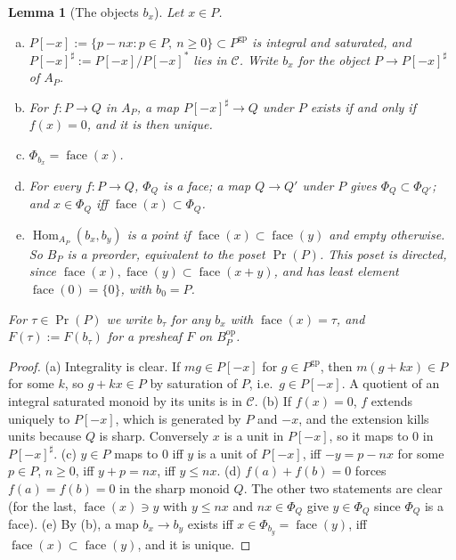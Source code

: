 \documentclass[11pt]{article}
\newtheorem{lemma}[theorem]{Lemma}
\theoremstyle{definition}
\theoremstyle{remark}
\newcommand{\cC}{\mathcal{C}}
\newcommand{\gp}{\mathrm{gp}}
\newcommand{\face}{\operatorname{face}}
\newcommand{\Prin}{\operatorname{Pr}}
\newcommand{\Hom}{\operatorname{Hom}}
\begin{document}
\begin{lemma}[The objects $b_x$]\label{lem:bx}
Let $x\in P$.
\begin{enumerate}[(a)]
\item $P[-x]:=\{p-nx: p\in P,\ n\ge0\}\subset P^{\gp}$ is integral and saturated, and $P[-x]^\sharp:=P[-x]/P[-x]^*$ lies in $\cC$. Write $b_x$ for the object $P\to P[-x]^\sharp$ of $A_P$.
\item For $f\colon P\to Q$ in $A_P$, a map $P[-x]^\sharp\to Q$ under $P$ exists if and only if $f(x)=0$, and it is then unique.
\item $\Phi_{b_x}=\face(x)$.
\item For every $f\colon P\to Q$, $\Phi_Q$ is a face; a map $Q\to Q'$ under $P$ gives $\Phi_Q\subset\Phi_{Q'}$; and $x\in\Phi_Q$ iff $\face(x)\subset\Phi_Q$.
\item $\Hom_{A_P}(b_x,b_y)$ is a point if $\face(x)\subset\face(y)$ and empty otherwise. So $B_P$ is a preorder, equivalent to the poset $\Prin(P)$. This poset is directed, since $\face(x),\face(y)\subset\face(x+y)$, and has least element $\face(0)=\{0\}$, with $b_0=P$.
\end{enumerate}
For $\tau\in\Prin(P)$ we write $b_\tau$ for any $b_x$ with $\face(x)=\tau$, and $F(\tau):=F(b_\tau)$ for a presheaf $F$ on $B_P^{\mathrm{op}}$.
\end{lemma}
\begin{proof}
(a) Integrality is clear. If $mg\in P[-x]$ for $g\in P^{\gp}$, then $m(g+kx)\in P$ for some $k$, so $g+kx\in P$ by saturation of $P$, i.e.\ $g\in P[-x]$. A quotient of an integral saturated monoid by its units is in $\cC$.
(b) If $f(x)=0$, $f$ extends uniquely to $P[-x]$, which is generated by $P$ and $-x$, and the extension kills units because $Q$ is sharp. Conversely $x$ is a unit in $P[-x]$, so it maps to $0$ in $P[-x]^\sharp$.
(c) $y\in P$ maps to $0$ iff $y$ is a unit of $P[-x]$, iff $-y=p-nx$ for some $p\in P$, $n\ge0$, iff $y+p=nx$, iff $y\le nx$.
(d) $f(a)+f(b)=0$ forces $f(a)=f(b)=0$ in the sharp monoid $Q$. The other two statements are clear (for the last, $\face(x)\ni y$ with $y\le nx$ and $nx\in\Phi_Q$ give $y\in\Phi_Q$ since $\Phi_Q$ is a face).
(e) By (b), a map $b_x\to b_y$ exists iff $x\in\Phi_{b_y}=\face(y)$, iff $\face(x)\subset\face(y)$, and it is unique.
\end{proof}
\end{document}

